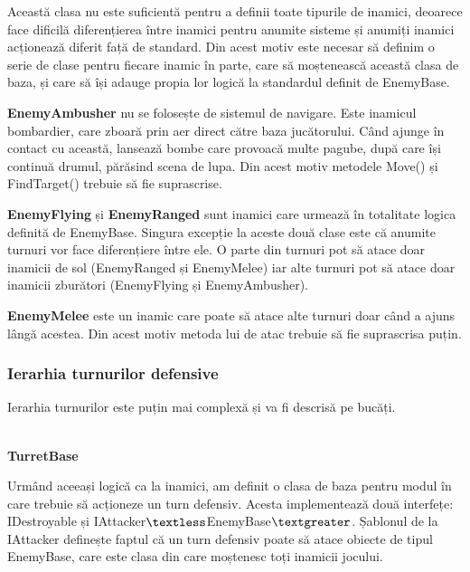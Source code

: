 \documentclass[12pt, a4paper]{article}
\begin{document}
	Această clasa nu este suficientă pentru a definii toate tipurile de inamici, deoarece face dificilă diferențierea între inamici pentru anumite sisteme și anumiți inamici acționează diferit față de standard. Din acest motiv este necesar să definim o serie de clase pentru fiecare inamic în parte, care să moștenească această clasa de baza, și care să își adauge propia lor logică la standardul definit de EnemyBase.
	\newline
	
	\textbf{EnemyAmbusher} nu se folosește de sistemul de navigare. Este inamicul bombardier, care zboară prin aer direct către baza jucătorului. Când ajunge în contact cu această, lansează bombe care provoacă multe pagube, după care își continuă drumul, părăsind scena de lupa. Din acest motiv metodele Move() și FindTarget() trebuie să fie suprascrise.
	\newline
	
	\textbf{EnemyFlying} și \textbf{EnemyRanged} sunt inamici care urmează în totalitate logica definită de EnemyBase. Singura excepție la aceste două clase este că anumite turnuri vor face diferențiere între ele. O parte din turnuri pot să atace doar inamicii de sol (EnemyRanged și EnemyMelee) iar alte turnuri pot să atace doar inamicii zburători (EnemyFlying și EnemyAmbusher).
	\newline
	
	\textbf{EnemyMelee} este un inamic care poate să atace alte turnuri doar când a ajuns lângă acestea. Din acest motiv metoda lui de atac trebuie să fie suprascrisa puțin.
	
	
	
	
	
	\subsubsection{Ierarhia turnurilor defensive}
	\label{section: turretHierachy}
	
	Ierarhia turnurilor este puțin mai complexă și va fi descrisă pe bucăți.
	
	\ \\
	\textbf{TurretBase}
	
	Urmând aceeași logică ca la inamici, am definit o clasa de baza pentru modul în care trebuie să acționeze un turn defensiv. Acesta implementează două interfețe: IDestroyable și IAttacker$\textless$EnemyBase$\textgreater$. Șablonul de la IAttacker definește faptul că un turn defensiv poate să atace obiecte de tipul EnemyBase, care este clasa din care moștenesc toți inamicii jocului.
	\newline
	
\end{document}
